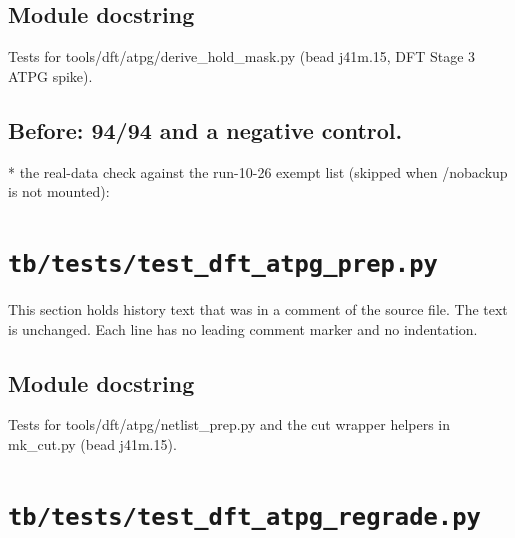 \begin{record}

\subsection*{Module docstring}

\begin{textblock}
Tests for tools/dft/atpg/derive_hold_mask.py (bead j41m.15, DFT Stage 3 ATPG spike).
\end{textblock}

\subsection*{Before: 94/94 and a negative control.}

\begin{textblock}
* the real-data check against the run-10-26 exempt list (skipped when /nobackup is not mounted):
\end{textblock}

\end{record}

\section{\texttt{tb/tests/test\_dft\_atpg\_prep.py}}\label{cr:suite:test-dft-atpg-prep}

This section holds history text that was in a comment of the source file. The text is unchanged. Each line has no leading comment marker and no indentation.

\begin{record}

\subsection*{Module docstring}

\begin{textblock}
Tests for tools/dft/atpg/netlist_prep.py and the cut wrapper helpers in mk_cut.py (bead j41m.15).
\end{textblock}

\end{record}

\section{\texttt{tb/tests/test\_dft\_atpg\_regrade.py}}\label{cr:suite:test-dft-atpg-regrade}

